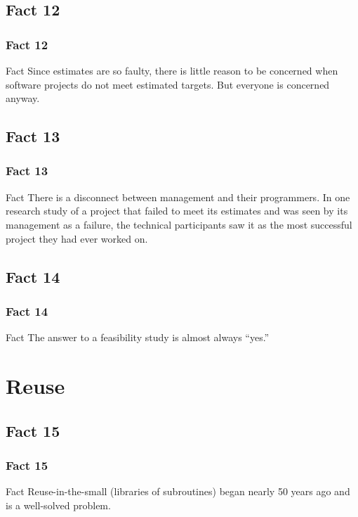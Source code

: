 \documentclass{beamer}
\begin{document}
\subsection{Fact 12}
\begin{frame}
    \frametitle{Fact 12}
    \begin{block}{Fact}
    Since estimates are so faulty, there is little reason to be concerned when
    software projects do not meet estimated targets. But everyone is concerned
    anyway.
    \end{block}
\end{frame}

\subsection{Fact 13}
\begin{frame}
    \frametitle{Fact 13}
    \begin{block}{Fact}
    There is a disconnect between management and their programmers. In one
    research study of a project that failed to meet its estimates and was seen
    by its management as a failure, the technical participants saw it as the
    most successful project they had ever worked on.
    \end{block}
\end{frame}

\subsection{Fact 14}
\begin{frame}
    \frametitle{Fact 14}
    \begin{block}{Fact}
    The answer to a feasibility study is almost always \enquote{yes.}
    \end{block}
\end{frame}

\section{Reuse}

\subsection{Fact 15}
\begin{frame}
    \frametitle{Fact 15}
    \begin{block}{Fact}
    Reuse-in-the-small (libraries of subroutines) began nearly 50 years ago and
    is a well-solved problem.
    \end{block}
\end{frame}
\end{document}
